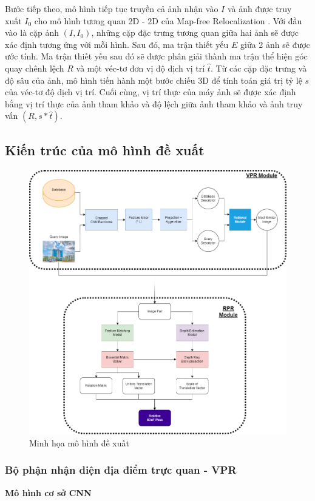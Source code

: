 Bước tiếp theo, mô hình tiếp tục truyền cả ảnh nhận vào $I$ và ảnh được truy xuất $I_0$ cho mô hình tương quan 2D - 2D của Map-free Relocalization \cite{arnold2022mapfree}. Với đầu vào là cặp ảnh $(I, I_0)$, những cặp đặc trưng tương quan giữa hai ảnh sẽ được xác định tương ứng với mỗi hình. Sau đó, ma trận thiết yếu $E$ giữa 2 ảnh sẽ được ước tính. Ma trận thiết yếu sau đó sẽ được phân giải thành ma trận thể hiện góc quay chênh lệch $R$ và một véc-tơ đơn vị độ dịch vị trí $\hat{t}$. Từ các cặp đặc trưng và độ sâu của ảnh, mô hình tiến hành một bước chiếu 3D để tính toán giá trị tỷ lệ $s$ của véc-tơ độ dịch vị trí. Cuối cùng, vị trí thực của máy ảnh sẽ được xác định bằng vị trí thực của ảnh tham khảo và độ lệch giữa ảnh tham khảo và ảnh truy vấn $(R,s*\hat{t})$.

\subsection{Kiến trúc của mô hình đề xuất}
\begin{figure}[H]
    \centering
    \includegraphics[scale=0.4]{pics/Proposal/models.png}
    \caption{Minh họa mô hình đề xuất}
\end{figure}

\subsubsection*{Bộ phận nhận diện địa điểm trực quan - VPR}
\textbf{Mô hình cơ sở CNN}

